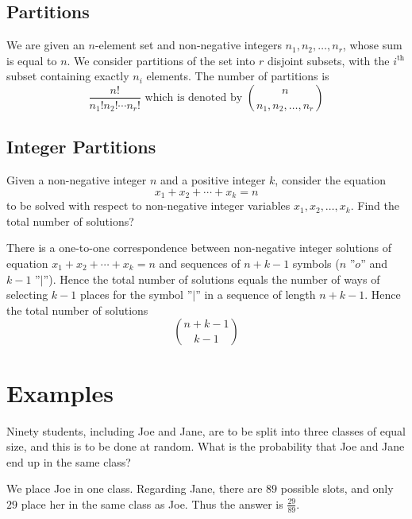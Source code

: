 \documentclass{tufte-handout}
\theoremstyle{definition} \newtheorem{definition}{Definition}
\theoremstyle{definition} \newtheorem{remark}{Remark}
\begin{document}
\subsection{Partitions}
We are given an $n$-element set and non-negative integers
$n_1, n_2, \ldots, n_r$, whose sum is equal to $n$. We consider partitions
of the set into $r$ disjoint subsets, with the $i^{\text{th}}$ subset
containing exactly $n_i$ elements. The number of partitions is
\begin{equation*}
  \frac{n!}{n_1! n_2! \cdots n_r!} \text{ which is denoted by }
  \binom{n}{n_1, n_2, \ldots, n_r}
\end{equation*}

\subsection{Integer Partitions}
Given a non-negative integer $n$ and a positive integer $k$, consider the
equation
\begin{equation*}
  x_1 + x_2 + \cdots + x_k = n
\end{equation*}
to be solved with respect to non-negative integer variables
$x_1, x_2, \ldots, x_k$. Find the total number of solutions?

There is a one-to-one correspondence between non-negative integer
solutions of equation $x_1 + x_2 + \cdots + x_k = n$ and sequences of
$n + k - 1$ symbols ($n$ ''$o$'' and $k - 1$ ''$|$''). Hence the total
number of solutions equals the number of ways of selecting $k - 1$ places
for the symbol ''$|$'' in a sequence of length $n + k - 1$. Hence the
total number of solutions
\begin{equation*}
  \binom{n + k - 1}{k - 1}
\end{equation*}
\section{Examples}
\begin{example}
  Ninety students, including Joe and Jane, are to be split into three
  classes of equal size, and this is to be done at random. What is the
  probability that Joe and Jane end up in the same class?
\end{example}

\begin{solution}
  We place Joe in one class. Regarding Jane, there are $89$ possible
  slots, and only $29$ place her in the same class as Joe. Thus the
  answer is $\frac{29}{89}$.
\end{solution}
\end{document}
